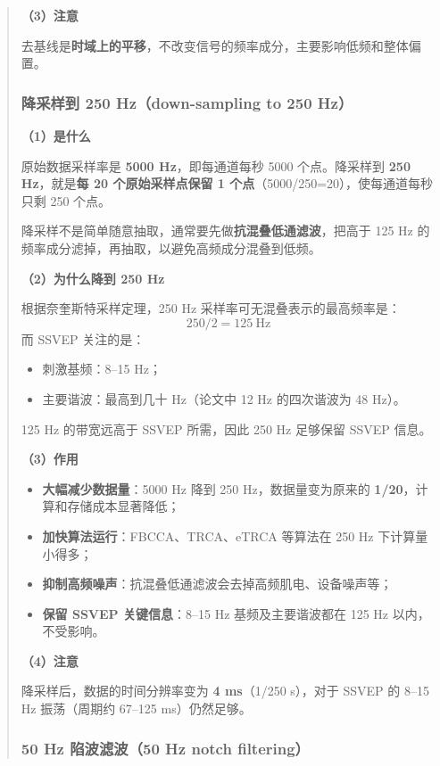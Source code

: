 \documentclass[12pt, a4paper]{ctexart}
\begin{document}
\begin{quote}
\textbf{（3）注意}

去基线是\textbf{时域上的平移}，不改变信号的频率成分，主要影响低频和整体偏置。

\subsubsection*{降采样到 250 Hz（down-sampling to 250 Hz）}

\textbf{（1）是什么}

原始数据采样率是 \textbf{5000 Hz}，即每通道每秒 5000 个点。降采样到 \textbf{250 Hz}，就是\textbf{每 20 个原始采样点保留 1 个点}（5000/250=20），使每通道每秒只剩 250 个点。

降采样不是简单随意抽取，通常要先做\textbf{抗混叠低通滤波}，把高于 125 Hz 的频率成分滤掉，再抽取，以避免高频成分混叠到低频。

\textbf{（2）为什么降到 250 Hz}

根据奈奎斯特采样定理，250 Hz 采样率可无混叠表示的最高频率是：
\[
250/2=125\ \text{Hz}
\]
而 SSVEP 关注的是：
\begin{itemize}
  \item 刺激基频：8--15 Hz；
  \item 主要谐波：最高到几十 Hz（论文中 12 Hz 的四次谐波为 48 Hz）。
\end{itemize}
125 Hz 的带宽远高于 SSVEP 所需，因此 250 Hz 足够保留 SSVEP 信息。

\textbf{（3）作用}
\begin{itemize}
  \item \textbf{大幅减少数据量}：5000 Hz 降到 250 Hz，数据量变为原来的 \textbf{1/20}，计算和存储成本显著降低；
  \item \textbf{加快算法运行}：FBCCA、TRCA、eTRCA 等算法在 250 Hz 下计算量小得多；
  \item \textbf{抑制高频噪声}：抗混叠低通滤波会去掉高频肌电、设备噪声等；
  \item \textbf{保留 SSVEP 关键信息}：8--15 Hz 基频及主要谐波都在 125 Hz 以内，不受影响。
\end{itemize}

\textbf{（4）注意}

降采样后，数据的时间分辨率变为 \textbf{4 ms}（1/250 s），对于 SSVEP 的 8--15 Hz 振荡（周期约 67--125 ms）仍然足够。

\subsubsection*{50 Hz 陷波滤波（50 Hz notch filtering）}


\end{quote}
\end{document}
